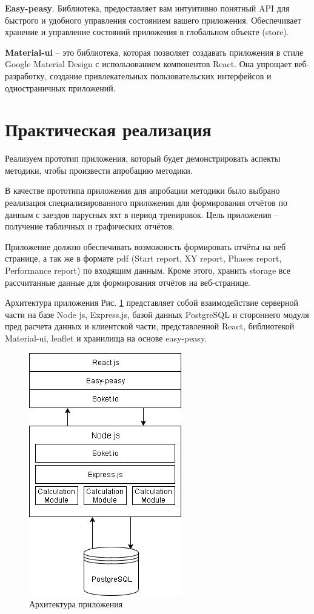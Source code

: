 \textbf{Easy-peasy}. Библиотека, предоставляет вам интуитивно понятный API для быстрого и удобного управления состоянием вашего приложения. Обеспечивает хранение и управление состояний приложения в глобальном объекте (store).

\textbf{Material-ui} – это библиотека, которая позволяет создавать приложения в стиле Google Material Design с использованием компонентов React. Она упрощает веб-разработку, создание привлекательных пользовательских интерфейсов и одностраничных приложений.

\section{Практическая реализация} \label{ch3:sec4}

Реализуем прототип приложения, который будет демонстрировать аспекты методики, чтобы произвести апробацию методики. 

В качестве прототипа приложения для апробации методики было выбрано реализация специализированного приложения для формирования отчётов по данным с заездов парусных яхт в период тренировок. Цель приложения – получение табличных и графических отчётов.

Приложение должно обеспечивать возможность формировать отчёты на веб странице, а так же в формате pdf (Start report, XY report, Phases report, Performance report) по входящим данным. Кроме этого, хранить storage все рассчитанные данные для формирования отчётов на веб-странице.

Архитектура приложения Рис. \ref{fig:АpplicationАrchitecture} представляет собой взаимодействие серверной части на базе Node js, Express.js, базой данных PostgreSQL и стороннего модуля пред расчета данных и клиентской части, представленной React, библиотекой Material-ui, leaflet и хранилища на основе easy-peasy. 

\begin{figure}
	\centering
	\includegraphics[scale=0.7]{my_folder/images/application architecture}
	\caption{Архитектура приложения}
	\label{fig:АpplicationАrchitecture}
\end{figure}

